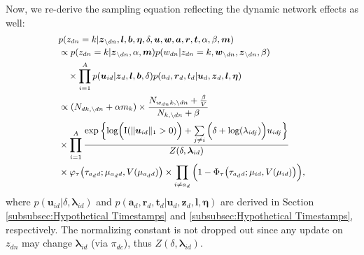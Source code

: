 \documentclass[twoside]{article}
\begin{document}
  	  Now, we re-derive the sampling equation reflecting the dynamic network effects as well:
  	   \begin{equation*}
  	   \footnotesize
  	   \begin{aligned}
  	   &p(z_{dn}=k | \boldsymbol{z}_{\backslash dn}, \boldsymbol{l}, \boldsymbol{b},\boldsymbol{\eta}, \delta, \boldsymbol{u}, \boldsymbol{w}, \boldsymbol{a}, \boldsymbol{r}, \boldsymbol{t}, \alpha, \beta, \boldsymbol{m})\\&\propto
  	   p(z_{dn}=k| \boldsymbol{z}_{\backslash dn}, \alpha, \boldsymbol{m}) p(w_{dn}| z_{dn}=k,\boldsymbol{w}_{\backslash dn}, \boldsymbol{z}_{\backslash dn},\beta) \\&\quad\times\prod_{i=1}^A  p(\boldsymbol{u}_{id}|\boldsymbol{z}_d, \boldsymbol{l}, \boldsymbol{b}, \delta)p({a}_d, \boldsymbol{r}_d, {t}_d|\boldsymbol{u}_d,\boldsymbol{z}_d, \boldsymbol{l}, \boldsymbol{\eta} )\\&\propto
  	   ({N_{dk, \backslash dn}+\alpha m_k})\times 	  \frac{N_{w_{dn}k, \backslash dn}+\frac{\beta}{V}}{N_{k, \backslash dn}+\beta}
  	   \\&  \times\prod_{i=1}^A \frac{\exp\Big\{\mbox{log}\Big(\text{I}( \lVert \boldsymbol{u}_{id}\rVert_1 > 0 )\Big) + \sum\limits_{j \neq i} \Big(\delta+\mbox{log}(\lambda_{idj})\Big)u_{idj}\Big\}}{Z(\delta,\boldsymbol{\lambda}_{id})}
  	   \\& \times\varphi_{\tau}\big(\tau_{a_d d}; \mu_{a_d d}, V(\mu_{a_d d})\big)\times  \prod_{i\neq a_d}\Big(1-\Phi_{\tau} \big(\tau_{a_d d}; \mu_{i d}, V(\mu_{i d})\big) \Big),
  	   \end{aligned}
  	   \end{equation*}
  	   where $p(\boldsymbol{u}_{id}|\delta, \boldsymbol{\lambda}_{id})$ and $p(\boldsymbol{a}_d, \boldsymbol{r}_d, \boldsymbol{t}_d|\boldsymbol{u}_d,\boldsymbol{z}_d, \boldsymbol{l}, \boldsymbol{\eta} )$ are derived in Section \ref{subsubsec:Hypothetical Timestamps} and \ref{subsubsec:Hypothetical Timestamps}, respectively. The normalizing constant is not dropped out since any update on $z_{dn}$ may change $\boldsymbol{\lambda}_{id}$ (via $\pi_{dc}$), thus $Z(\delta,\boldsymbol{\lambda}_{id})$.
  	  
\end{document}
